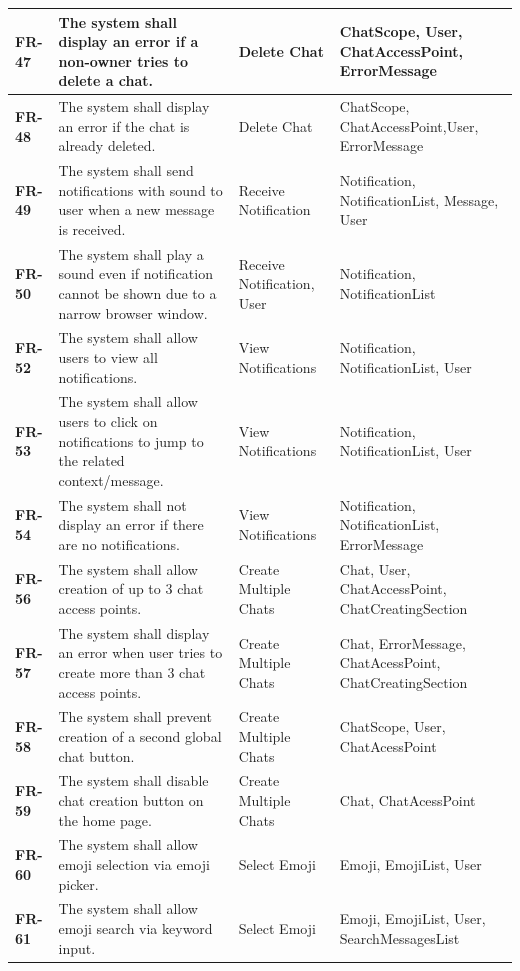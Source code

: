 \begin{longtable}{|p{3cm}|p{5.5cm}|l|p{4cm}|}
\hline
\textbf{FR-47} & The system shall display an error if a non-owner tries to delete a chat. & Delete Chat & ChatScope, User, ChatAccessPoint, ErrorMessage \\
\hline
\textbf{FR-48} & The system shall display an error if the chat is already deleted. & Delete Chat & ChatScope, ChatAccessPoint,User, ErrorMessage \\
\hline
\textbf{FR-49} & The system shall send notifications with sound to user when a new message is received. & Receive Notification & Notification, NotificationList, Message, User \\
\hline
\textbf{FR-50} & The system shall play a sound even if notification cannot be shown due to a narrow browser window. & Receive Notification, User & Notification, NotificationList \\
\hline
\textbf{FR-52} & The system shall allow users to view all notifications. & View Notifications & Notification, NotificationList, User \\
\hline
\textbf{FR-53} & The system shall allow users to click on notifications to jump to the related context/message. & View Notifications & Notification, NotificationList, User \\
\hline
\textbf{FR-54} & The system shall not display an error if there are no notifications. & View Notifications & Notification, NotificationList, ErrorMessage \\
\hline
\textbf{FR-56} & The system shall allow creation of up to 3 chat access points. & Create Multiple Chats & Chat, User, ChatAccessPoint, ChatCreatingSection \\
\hline
\textbf{FR-57} & The system shall display an error when user tries to create more than 3 chat access points. & Create Multiple Chats & Chat, ErrorMessage, ChatAcessPoint, ChatCreatingSection \\
\hline
\textbf{FR-58} & The system shall prevent creation of a second global chat button. & Create Multiple Chats & ChatScope, User, ChatAcessPoint \\
\hline
\textbf{FR-59} & The system shall disable chat creation button on the home page. & Create Multiple Chats & Chat, ChatAcessPoint \\
\hline
\textbf{FR-60} & The system shall allow emoji selection via emoji picker. & Select Emoji & Emoji, EmojiList, User \\
\hline
\textbf{FR-61} & The system shall allow emoji search via keyword input. & Select Emoji & Emoji, EmojiList, User, SearchMessagesList \\

\end{longtable}
